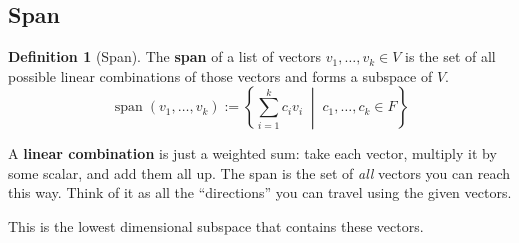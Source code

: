 \documentclass[11pt]{article}
\theoremstyle{definition}
\newtheorem{definition}{Definition}[section]
\theoremstyle{plain}
\theoremstyle{remark}
\DeclareMathOperator{\spn}{span}
\begin{document}
\subsection{Span}

\begin{definition}[Span]
The \textbf{span} of a list of vectors $v_1, \ldots, v_k \in V$ is the set of all possible linear combinations of those vectors and forms a subspace of $V$.
\[
\spn(v_1, \ldots, v_k) := \left\{\sum_{i=1}^{k} c_i v_i \;\middle|\; c_1, \ldots, c_k \in F\right\}
\]
\end{definition}

\begin{intuitionbox}
A \textbf{linear combination} is just a weighted sum: take each vector, multiply it by some scalar, and add them all up. The span is the set of \textit{all} vectors you can reach this way. Think of it as all the ``directions'' you can travel using the given vectors.
\end{intuitionbox}

This is the lowest dimensional subspace that contains these vectors.
\end{document}
